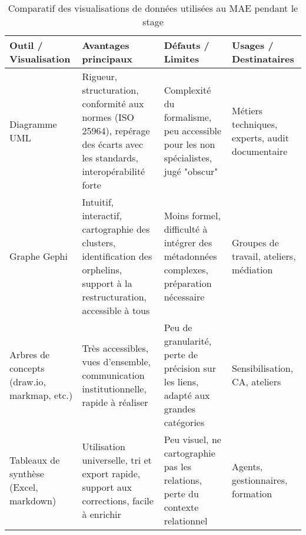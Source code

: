 \begin{table}[htbp]
	\caption{Comparatif des visualisations de données utilisées au MAE pendant le stage}
	\label{tab:comparatif_visualisations}
	\centering
	\setlength{\arrayrulewidth}{0.6pt}
	\renewcommand{\arraystretch}{1.3}
	\begin{tabular}{|p{3cm}|p{4cm}|p{4cm}|p{3cm}|}
		\hline
		\rowcolor{lightgray}
		\textbf{Outil / Visualisation} & \textbf{Avantages principaux} & \textbf{Défauts / Limites} & \textbf{Usages / Destinataires} \\
		\hline
		Diagramme UML & Rigueur, structuration, conformité aux normes (ISO 25964), repérage des écarts avec les standards, interopérabilité forte & Complexité du formalisme, peu accessible pour les non spécialistes, jugé "obscur" & Métiers techniques, experts, audit documentaire \\
		\hline
		Graphe Gephi & Intuitif, interactif, cartographie des clusters, identification des orphelins, support à la restructuration, accessible à tous & Moins formel, difficulté à intégrer des métadonnées complexes, préparation nécessaire & Groupes de travail, ateliers, médiation \\
		\hline
		Arbres de concepts (draw.io, markmap, etc.) & Très accessibles, vues d'ensemble, communication institutionnelle, rapide à réaliser & Peu de granularité, perte de précision sur les liens, adapté aux grandes catégories & Sensibilisation, CA, ateliers \\
		\hline
		Tableaux de synthèse (Excel, markdown) & Utilisation universelle, tri et export rapide, support aux corrections, facile à enrichir & Peu visuel, ne cartographie pas les relations, perte du contexte relationnel & Agents, gestionnaires, formation \\
		\hline
	\end{tabular}
\end{table}
